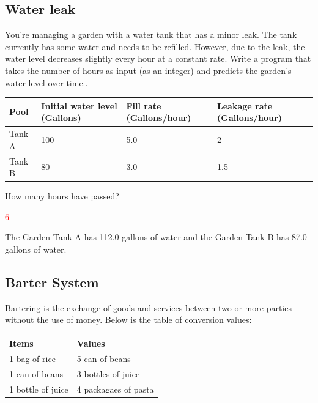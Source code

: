 \subsection{Water leak}
You’re managing a garden with a water tank that has a minor leak. The tank currently has some water and needs to be refilled. However, due to the leak, the water level decreases slightly every hour at a constant rate. Write a program that takes the number of hours as input (as an integer) and predicts the garden’s water level over time..

\begin{table}[H]
    \centering
    \begin{tabular}{|p{1 in}|p{1.5 in}|p{1.5 in}|p{1.5 in}|} \hline
    \textbf{Pool} & \textbf{Initial water level (Gallons)} & \textbf{Fill rate (Gallons/hour)} & \textbf{Leakage rate (Gallons/hour)} \\ \hline
    Tank A & 100 & 5.0 & 2 \\ \hline
    Tank B & 80 & 3.0 & 1.5 \\ \hline
    \end{tabular}
\end{table}

\begin{sample}
How many hours have passed?

\textcolor{red}{6}

The Garden Tank A has 112.0 gallons of water and the Garden Tank B has 87.0 gallons of water.

\end{sample}

\subsection{Barter System}
Bartering is the exchange of goods and services between two or more parties without the use of money. Below is the table of conversion values:

\begin{table}[H]
    \centering
    \begin{tabular}{|p{1 in}|p{1 in}|} \hline
    \textbf{Items} & \textbf{Values} \\ \hline
    1 bag of rice & 5 can of beans \\ \hline
    1 can of beans & 3 bottles of juice \\ \hline
    1 bottle of juice & 4 packagaes of pasta \\ \hline
    \end{tabular}
\end{table}

